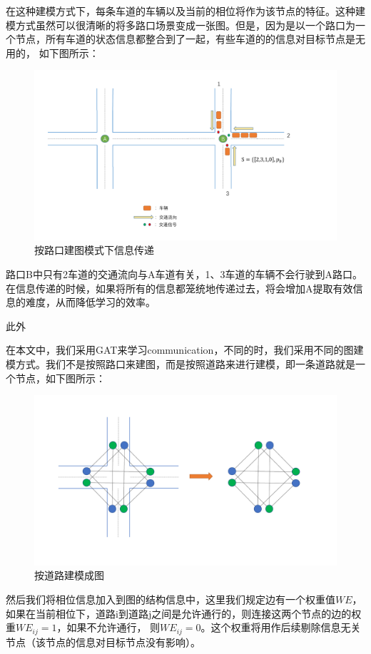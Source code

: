 在这种建模方式下，每条车道的车辆以及当前的相位将作为该节点的特征。这种建模方式虽然可以很清晰的将多路口场景变成一张图。但是，因为是以一个路口为一个节点，所有车道的状态信息都整合到了一起，有些车道的的信息对目标节点是无用的，
如下图所示：
\begin{figure}[htb]
  \includegraphics[width=12cm]{ppt/information-redundancy.pdf}
  \caption{按路口建图模式下信息传递}
  \label{fig:information-redundancy}
\end{figure}

路口B中只有2车道的交通流向与A车道有关，1、3车道的车辆不会行驶到A路口。在信息传递的时候，如果将所有的信息都笼统地传递过去，将会增加A提取有效信息的难度，从而降低学习的效率。

此外


在本文中，我们采用GAT来学习communication，不同的时，我们采用不同的图建模方式。我们不是按照路口来建图，而是按照道路来进行建模，即一条道路就是一个节点，如下图所示：
\begin{figure}[htb]
  \includegraphics[width=12cm]{ppt/graph-modeling.pdf}
  \caption{按道路建模成图}
  \label{fig:network-graph-new}
\end{figure}

然后我们将相位信息加入到图的结构信息中，这里我们规定边有一个权重值$WE$，如果在当前相位下，道路i到道路j之间是允许通行的，则连接这两个节点的边的权重$WE_{ij}=1$，如果不允许通行，
则$WE_{ij}=0$。这个权重将用作后续剔除信息无关节点（该节点的信息对目标节点没有影响）。


